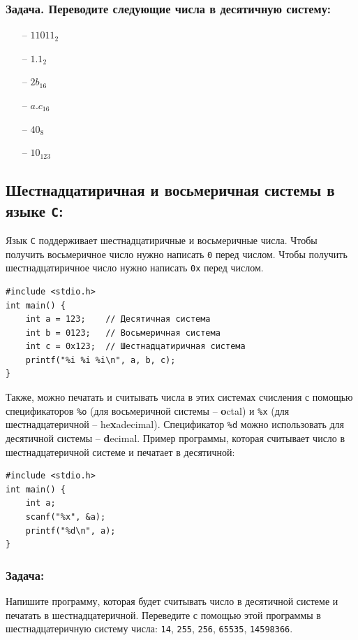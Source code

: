 \documentclass{article}
\begin{document}
\subsubsection*{Задача. Переводите следующие числа в десятичную систему:}
\begin{multicols}{3}
\begin{itemize}
\item[--] $11011_2$
\item[--] $1.1_2$
\item[--] $2b_{16}$
\item[--] $a.c_{16}$
\item[--] $40_{8}$
\item[--] $10_{123}$
\end{itemize}
\end{multicols}

\subsection*{Шестнадцатиричная и восьмеричная системы в языке \texttt{C}:}
Язык \texttt{C} поддерживает шестнадцатиричные и восьмеричные числа. Чтобы получить восьмеричное число нужно написать \texttt{0} перед числом. Чтобы получить шестнадцатиричное число нужно написать \texttt{0x} перед числом.
\begin{lstlisting}
#include <stdio.h>
int main() {
    int a = 123;    // Десятичная система
    int b = 0123;   // Восьмеричная система
    int c = 0x123;  // Шестнадцатиричная система
    printf("%i %i %i\n", a, b, c);
}
\end{lstlisting}
Также, можно печатать и считывать числа в этих системах счисления с помощью спецификаторов \texttt{\%o} (для восьмеричной системы -- \textbf{o}ctal) и \texttt{\%x} (для шестнадцатеричной -- he\textbf{x}adecimal). Спецификатор \texttt{\%d} можно использовать для десятичной системы -- \textbf{d}ecimal. Пример программы, которая считывает число в шестнадцатеричной системе и печатает в десятичной:
\begin{lstlisting}
#include <stdio.h>
int main() {
    int a;
    scanf("%x", &a);
    printf("%d\n", a);
}
\end{lstlisting}
\subsubsection*{Задача:}
Напишите программу, которая будет считывать число в десятичной системе и печатать в шестнадцатеричной. Переведите с помощью этой программы в шестнадцатеричную систему числа: \texttt{14}, \texttt{255}, \texttt{256}, \texttt{65535}, \texttt{14598366}.\\
\newpage
\end{document}
